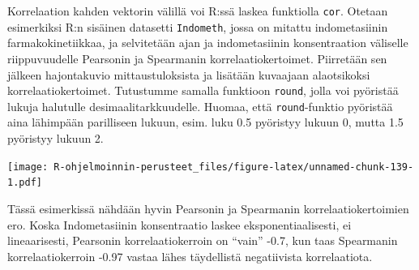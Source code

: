 \documentclass[
]{book}
\newenvironment{Shaded}{\begin{snugshade}}{\end{snugshade}}
\newcommand{\AttributeTok}[1]{\textcolor[rgb]{0.77,0.63,0.00}{#1}}
\newcommand{\CommentTok}[1]{\textcolor[rgb]{0.56,0.35,0.01}{\textit{#1}}}
\newcommand{\DecValTok}[1]{\textcolor[rgb]{0.00,0.00,0.81}{#1}}
\newcommand{\FunctionTok}[1]{\textcolor[rgb]{0.00,0.00,0.00}{#1}}
\newcommand{\NormalTok}[1]{#1}
\newcommand{\OtherTok}[1]{\textcolor[rgb]{0.56,0.35,0.01}{#1}}
\newcommand{\SpecialCharTok}[1]{\textcolor[rgb]{0.00,0.00,0.00}{#1}}
\newcommand{\StringTok}[1]{\textcolor[rgb]{0.31,0.60,0.02}{#1}}
\begin{document}
Korrelaation kahden vektorin välillä voi R:ssä laskea funktiolla \texttt{cor}. Otetaan esimerkiksi R:n sisäinen datasetti \texttt{Indometh}, jossa on mitattu indometasiinin farmakokinetiikkaa, ja selvitetään ajan ja indometasiinin konsentraation väliselle riippuvuudelle Pearsonin ja Spearmanin korrelaatiokertoimet. Piirretään sen jälkeen hajontakuvio mittaustuloksista ja lisätään kuvaajaan alaotsikoksi korrelaatiokertoimet. Tutustumme samalla funktioon \texttt{round}, jolla voi pyöristää lukuja halutulle desimaalitarkkuudelle. Huomaa, että \texttt{round}-funktio pyöristää aina lähimpään parilliseen lukuun, esim. luku 0.5 pyöristyy lukuun 0, mutta 1.5 pyöristyy lukuun 2.

\begin{Shaded}
\end{Shaded}

\texttt{[image: R-ohjelmoinnin-perusteet\_files/figure-latex/unnamed-chunk-139-1.pdf]}

Tässä esimerkissä nähdään hyvin Pearsonin ja Spearmanin korrelaatiokertoimien ero. Koska Indometasiinin konsentraatio laskee eksponentiaalisesti, ei lineaarisesti, Pearsonin korrelaatiokerroin on ``vain'' -0.7, kun taas Spearmanin korrelaatiokerroin -0.97 vastaa lähes täydellistä negatiivista korrelaatiota.
\end{document}
